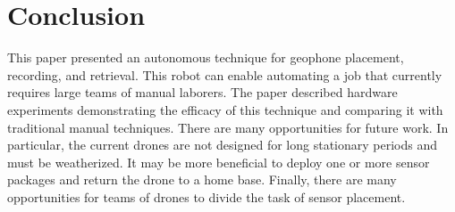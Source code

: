  \section{Conclusion}\label{sec:Conclusion}
This paper presented an autonomous technique for geophone placement, recording, and retrieval. This robot can enable automating a job that currently requires large teams of manual laborers.  
 The paper described hardware experiments demonstrating the efficacy of this technique and comparing it with traditional manual techniques. There are many opportunities for future work. In particular, the current drones are not designed for long stationary periods and must be weatherized. It may be more beneficial to deploy one or more sensor packages and return the drone to a home base. Finally, there are many opportunities for teams of drones to divide the task of sensor placement.